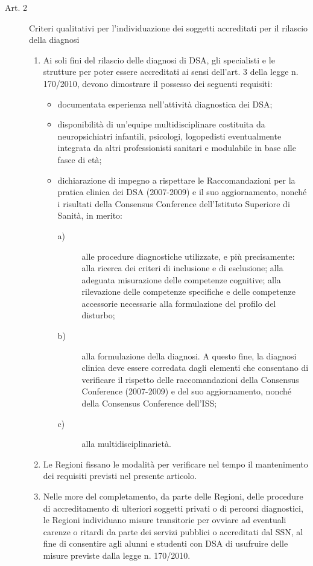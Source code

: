 \begin{description}
\begin{enumerate}
		\end{enumerate}
		\item[Art. 2] Criteri qualitativi per l'individuazione dei soggetti accreditati per il rilascio della diagnosi
		\begin{enumerate}
			\item Ai soli fini del rilascio delle diagnosi di DSA, gli specialisti e le strutture per poter essere accreditati ai sensi dell'art. 3 della legge n. 170/2010, devono dimostrare il possesso dei seguenti requisiti:
			\begin{itemize}
				\item documentata esperienza nell'attività diagnostica dei DSA;
				\item disponibilità di un'equipe multidisciplinare costituita da neuropsichiatri infantili, psicologi, logopedisti eventualmente integrata da altri professionisti sanitari e modulabile in base alle fasce di età;
				\item dichiarazione di impegno a rispettare le Raccomandazioni per la pratica clinica dei DSA (2007-2009) e il suo aggiornamento, nonché i risultati della Consensus Conference dell'Istituto Superiore di Sanità, in merito:
				\begin{description}
					\item[a)] alle procedure diagnostiche utilizzate, e più precisamente: alla ricerca dei criteri di inclusione e di esclusione; alla adeguata misurazione delle competenze cognitive; alla rilevazione delle competenze specifiche e delle competenze accessorie necessarie alla formulazione del profilo del disturbo;
					\item [b)] alla formulazione della diagnosi. A questo fine, la diagnosi clinica deve essere corredata dagli elementi che consentano di verificare il rispetto delle raccomandazioni della Consensus Conference (2007-2009) e del suo aggiornamento, nonché della Consensus Conference dell’ISS;
					\item [c)]alla multidisciplinarietà.
				\end{description}
			\end{itemize}
			\item Le Regioni fissano le modalità per verificare nel tempo il mantenimento dei requisiti previsti nel presente articolo.
			\item Nelle more del completamento, da parte delle Regioni, delle procedure di accreditamento di ulteriori soggetti privati o di percorsi diagnostici, le Regioni individuano misure transitorie per ovviare ad eventuali carenze o ritardi da parte dei servizi pubblici o accreditati dal SSN, al fine di consentire agli alunni e studenti con DSA di usufruire delle misure previste dalla legge n. 170/2010. 

\end{enumerate}
\end{description}
